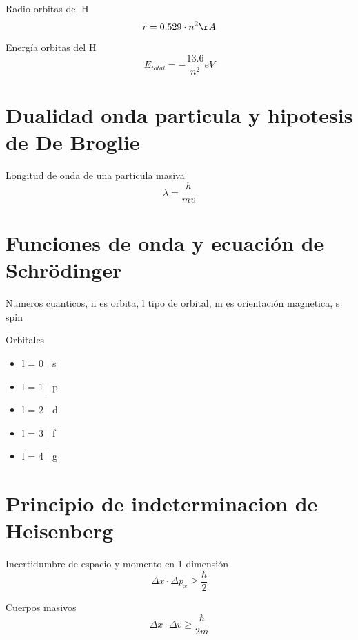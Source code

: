 \documentclass[12pt, letterpaper, twoside]{article}
\begin{document}
	Radio orbitas del H
	\begin{equation}
		r = 0.529 \cdot n^2 \AA
	\end{equation}

	Energía orbitas del H
	\begin{equation}
		E_{total} = - \frac{13.6}{n^2} eV
	\end{equation}

	\section{Dualidad onda particula y hipotesis de De Broglie}
	
	Longitud de onda de una particula masiva
	\begin{equation}
		\lambda = \frac{h}{mv}
	\end{equation}


	\section{Funciones de onda y ecuación de Schrödinger}
	Numeros cuanticos, n es orbita, l tipo de orbital, m es orientación magnetica, s spin

	Orbitales
	\begin{itemize}
		\item l = 0 | s
		\item l = 1 | p
		\item l = 2 | d
		\item l = 3 | f
		\item l = 4 | g
	\end{itemize}

	\section{Principio de indeterminacion de Heisenberg}
	
	Incertidumbre de espacio y momento en 1 dimensión
	\begin{equation}
		\Delta x \cdot \Delta p_x \geq \frac{\hbar}{2}
	\end{equation}

	Cuerpos masivos
	\begin{equation}
		\Delta x \cdot \Delta v \geq \frac{\hbar}{2m}
	\end{equation}
\end{document}

